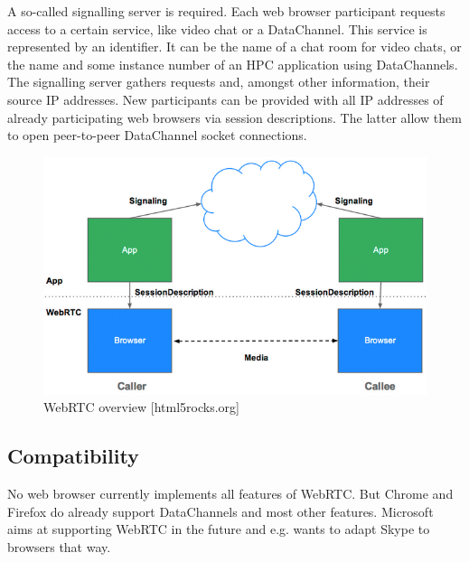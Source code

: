 A so-called signalling server is required. Each web browser participant requests access to a certain service, like video chat or a DataChannel. This service is represented by an identifier. It can be the name of a chat room for video chats, or the name and some instance number of an HPC application using DataChannels. The signalling server gathers requests and, amongst other information, their source IP addresses. New participants can be provided with all IP addresses of already participating web browsers via session descriptions. The latter allow them to open peer-to-peer DataChannel socket connections.

\begin{figure}[htp]
  \begin{center}
    \includegraphics[width=0.9\columnwidth]{resources/webrtc.png}
  \end{center}
  \caption{WebRTC overview [html5rocks.org]}
  \label{fig:webrtc}
\end{figure}


\subsection{Compatibility}

No web browser currently implements all features of WebRTC. But Chrome and Firefox do already support DataChannels and most other features. Microsoft aims at supporting WebRTC in the future and e.g. wants to adapt Skype to browsers that way. \cite{webrtc_comp} \cite{webrtc_ie}
